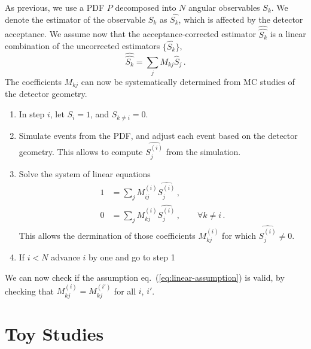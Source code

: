\documentclass[aps,prd,reprint,nofootinbib,preprintnumbers]{revtex4}
\newcommand{\refeq}[1]{eq.~(\ref{eq:#1})}
\newcommand{\est}[1]{\widehat{#1}}
\newcommand{\wwhat}[1]{\widehat{\widehat{#1}}}
\begin{document}
As previous, we use a PDF $P$ decomposed into $N$ angular observables $S_k$. We denote the estimator of the observable
$S_k$ as $\est{S_k}$, which is affected by the detector acceptance. We assume now that the acceptance-corrected estimator
$\wwhat{S_k}$ is a linear combination of the uncorrected estimators $\lbrace \est{S_k}\rbrace$,
\begin{equation}
    \label{eq:linear-assumption}
    \wwhat{S_k} = \sum_j M_{kj} \est{S}_j\,.
\end{equation}
The coefficients $M_{kj}$ can now be systematically determined from MC studies of the detector geometry.
\begin{enumerate}
    \item In step $i$, let $S_i = 1$, and $S_{k\neq i} = 0$.
    \item Simulate events from the PDF, and adjust each event based on the detector geometry. This allows
        to compute $\est{S_j^{(i)}}$ from the simulation.
    \item Solve the system of linear equations
        \begin{equation}
        \begin{aligned}
            1 & = \sum_j M_{ij}^{(i)} \est{S_j^{(i)}}\,,\\
            0 & = \sum_j M_{kj}^{(i)} \est{S_j^{(i)}}\,,\qquad\forall k \neq i\,.
        \end{aligned}
        \end{equation}
        This allows the dermination of those coefficients $M_{kj}^{(i)}$ for which $\est{S_j^{(i)}} \neq 0$.
    \item If $i < N$ advance $i$ by one and go to step 1
\end{enumerate}
We can now check if the assumption \refeq{linear-assumption} is valid, by checking that
$M_{kj}^{(i)} = M_{kj}^{(i')}$ for all $i$, $i'$.


\section{Toy Studies}
\label{sec:numerics}
\end{document}
